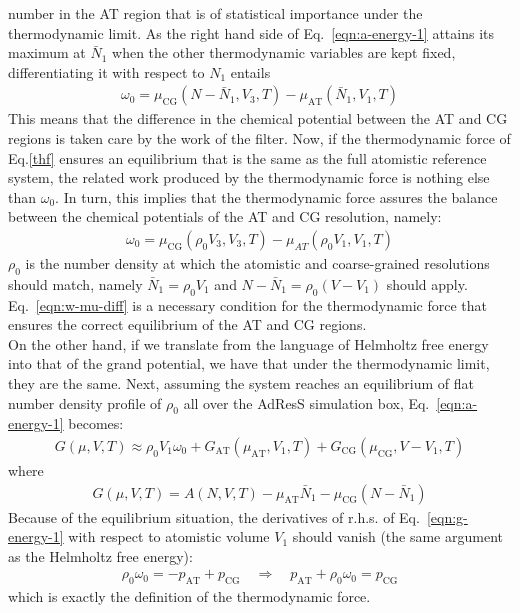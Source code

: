 \documentclass[aps,a4paper,reprint,onecolumn]{revtex4}
\newcommand{\AT}{{\textrm{{AT}}}}
\newcommand{\CG}{{\textrm{CG}}}
\begin{document}
number in the AT region that is of statistical importance
under the thermodynamic limit.
As the right hand side of
Eq.~\eqref{eqn:a-energy-1} attains its maximum at $\bar
N_1$ when the other thermodynamic variables are kept fixed, differentiating it with respect to $N_1$ entails
\begin{align}
  \omega_0 = \mu_{\CG}(N - \bar N_1, V_3, T)  - \mu_{\AT}(\bar N_1, V_1, T)
\end{align}
This means that the difference in the chemical potential between the AT and CG
regions is taken care by the work of the filter.
Now, if the thermodynamic force of Eq.\ref{thf} ensures an
equilibrium that is the same as the full atomistic reference system,
the related work produced by the thermodynamic force is nothing else than $\omega_0 $.
In turn, this implies that the thermodynamic force assures the balance between the chemical potentials of the AT and CG resolution,
namely:
\begin{align}\label{eqn:w-mu-diff}
  \omega_0 = \mu_{\CG}(\rho_0V_3, V_3, T) - \mu_{AT}(\rho_0 V_1, V_1, T)
\end{align}
$\rho_0$ is the number density at which the atomistic and coarse-grained
resolutions should match,
namely $\bar N_1 = \rho_0V_1$ and $N - \bar N_1 = \rho_0(V - V_1)$ should apply.
Eq.~\eqref{eqn:w-mu-diff} is a necessary
condition for the thermodynamic force that ensures
the correct equilibrium of the AT and CG regions.\\

\noindent
On the other hand, if we translate from the language of Helmholtz free
energy into that of the grand potential, we have that
under the thermodynamic limit, they are the same.
Next, assuming the system reaches an
equilibrium of flat number density profile of $\rho_0$ all over the AdResS simulation box, 
Eq.~\eqref{eqn:a-energy-1} becomes:
\begin{align}\label{eqn:g-energy-1}
  G(\mu, V, T) \approx
  \rho_0V_1\omega_0
  + G_{\AT}(\mu_{\AT}, V_1, T) + G_{\CG}(\mu_{\CG}, V - V_1, T)
\end{align}
where
\begin{align}
  G(\mu, V, T) = A(N, V, T) - \mu_{\AT} \bar N_1 - \mu_{\CG}(N - \bar N_1)
\end{align}
Because of the equilibrium situation, the derivatives of r.h.s. of
Eq.~\eqref{eqn:g-energy-1} with respect to atomistic volume $V_1$
should vanish (the same argument as the Helmholtz free energy):
\begin{align}
  \rho_0\omega_0 = -p_{\AT}+p_{\CG} \quad\Longrightarrow\quad
  p_{\AT} + \rho_0\omega_0 = p_{\CG}
\end{align}
which is exactly the definition of the thermodynamic force.
\end{document}
